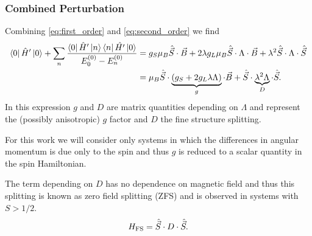 \subsubsection{Combined Perturbation}
Combining \eqref{eq:first_order} and \eqref{eq:second_order} we find 
\begin{equation}
    \begin{align}
    \bra{0} \hat{H}' \ket{0}+  \sum_{n}\frac{\bra{0} \hat{H}' \ket{n} \bra{n} \hat{H'}\ket{0}}{E_0^{(0)} - E_n^{(0)}}
    &= g_S \mu_B \hat{\vec{S}} \cdot \vec{B} + 2\lambda g_L\mu_B\hat{\vec{S}}\cdot\Lambda\cdot\vec{B} + \lambda^2 \hat{\vec{S}}\cdot \Lambda \cdot \hat{\vec{S}} \\ 
    &=\mu_B \hat{\vec{S}} \cdot \underbrace{(g_S + 2g_L \lambda \Lambda)}_{g} \cdot \vec{B} + \hat{\vec{S}}\cdot \underbrace{\lambda^2 \Lambda}_{D} \cdot \hat{\vec{S}}.
    \end{align}
    \label{eq:}
\end{equation}
In this expression $g$ and $D$ are matrix quantities depending on $\Lambda$ and represent the (possibly anisotropic) $g$ factor and $D$ the fine structure splitting. 

{\color{red}For this work we will consider only systems in which the differences in angular momentum is due only to the spin and thus $g$ is reduced to a scalar quantity in the spin Hamiltonian. 
}

The term depending on $D$ has no dependence on magnetic field and thus this  splitting is known as zero field splitting (ZFS) and is observed in systems with $S > 1/2$. 
\begin{equation}
    H_{\ce{FS}} = \hat{\vec{S}}\cdot D \cdot \hat{\vec{S}}. 
    \label{eq:fine_structure}
\end{equation}







